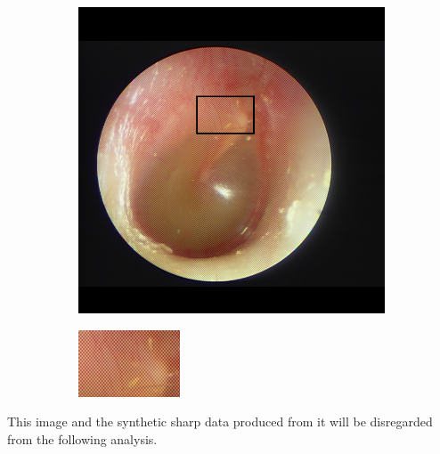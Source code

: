 \begin{figure}[H]
    \centering
    \begin{subfigure}[t]{0.48\textwidth}
	    \centering
	    \includegraphics[height=.66\textwidth]{Figures/lv/33.png}
	    \caption{}
    \end{subfigure}\hspace{1em}
    \begin{subfigure}[t]{0.48\textwidth}
	    \centering
	    \includegraphics[height=.66\textwidth]{Figures/lv/33_zoom.png}
	    \caption{}
    \end{subfigure}\hspace{1em}
\end{figure}

This image and the synthetic sharp data produced from it will be disregarded from the following analysis.



